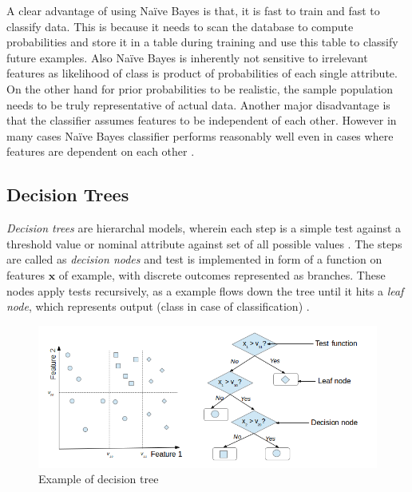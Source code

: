 A clear advantage of using Na\"{i}ve Bayes is that, it is fast to train and fast to classify data. This is because it needs to scan the database to compute probabilities and store it in a table during training and use this table to classify future examples. Also Na\"{i}ve Bayes is inherently not sensitive to irrelevant features as likelihood of class is product of probabilities of each single attribute. On the other hand for prior probabilities to be realistic, the sample population needs to be truly representative of actual data. Another major disadvantage is that the classifier assumes features to be independent of each other. However in many cases Na\"{i}ve Bayes classifier performs reasonably well even in cases where features are dependent on each other \cite{John1995, Williams2006}.

\subsection{Decision Trees}
\emph{Decision trees} are hierarchal models, wherein each step is a simple test against a threshold value or nominal attribute against set of all possible values \cite{Kotsiantis2013}. The steps are called as \emph{decision nodes} and test is implemented in form of a function on features $\boldsymbol{x}$ of example, with discrete outcomes represented as branches. These nodes apply tests recursively, as a example flows down the tree until it hits a \emph{leaf node}, which represents output (class in case of classification) \cite{Alpaydin2004}.

\begin{figure}[h]
  \begin{center}
    \captionsetup{justification=centering}
    \includegraphics[scale=0.65]{figures/desctree.png}
    \caption{Example of decision tree}
    \label{fig:desctree}
  \end{center}
\end{figure}

